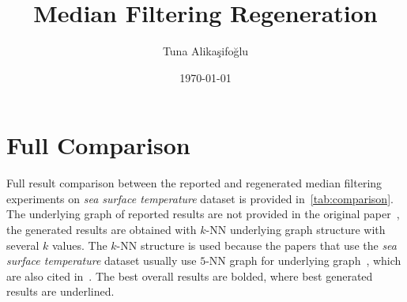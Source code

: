 \documentclass[a4paper, 12pt]{article}
\title{Median Filtering Regeneration}
\author{Tuna Alikaşifoğlu}
\date{\today}
\begin{document}
\maketitle

\section{Full Comparison}
Full result comparison between the reported and regenerated median filtering experiments on \textit{sea surface temperature} dataset is provided in~\cref{tab:comparison}. The underlying graph of reported results are not provided in the original paper~\cite{median}, the generated results are obtained with \(k\)-NN underlying graph structure with several \(k\) values. The \(k\)-NN structure is used because the papers that use the \textit{sea surface temperature} dataset usually use \(5\)-NN graph for underlying graph~\cite{reconstruction,sobolev}, which are also cited in~\cite{median}. The best overall results are bolded, where best generated results are underlined.
\end{document}
